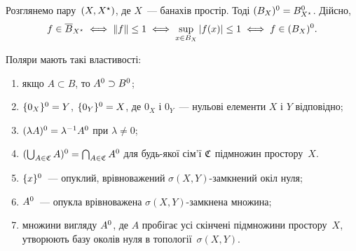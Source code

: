 \begin{example}
    Розглянемо пару~$(X, \conjugate X)$, де $X$~--- банахів простір. Тоді $(B_X)\polar = B_{\conjugate X}\polar$. Дійсно,
    \begin{equation*}
        f \in \closure B_{\conjugate X} \iff \|f\| \le 1 \iff \sup_{x \in B_X} |f(x)| \le 1 \iff f \in (B_X)\polar.
    \end{equation*}
\end{example}

\begin{theorem}
    Поляри мають такі властивості:
    \begin{enumerate}
        \item якщо $A \subset B$, то $A\polar \supset B\polar$;
        \item $\{0_X\}\polar = Y$, $\{0_Y\}\polar = X$, де $0_X$ і $0_Y$~--- нульові елементи $X$ і $Y$ відповідно;
        \item $(\lambda A)\polar = \lambda\inv A\polar$ при $\lambda \ne 0$;
        \item $(\bigcup_{A \in \frak C} A)\polar = \bigcap_{A \in \frak C} A\polar$ для будь-якої сім'ї $\frak C$ підмножин простору~$X$. %
        \item $\{x\}\polar$~--- опуклий, врівноважений $\sigma(X, Y)$-замкнений окіл нуля; %
        \item $A\polar$~--- опукла врівноважена $\sigma(X, Y)$-замкнена множина; %
        \item множини вигляду $A\polar$, де $A$ пробігає усі скінчені підмножини простору~$X$, утворюють базу околів нуля в топології~$\sigma(X, Y)$.
    \end{enumerate}
\end{theorem}

